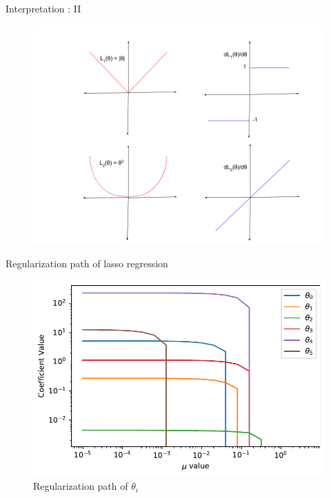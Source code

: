 \documentclass{beamer}
\begin{document}
\begin{frame}{Interpretation : II}
\begin{figure}
    \centering
    \includegraphics[scale = 0.3]{Lasso/lasso_3.png}
    \label{fig:my_label}
\end{figure}

\end{frame}




\begin{frame}{Regularization path of lasso regression}
\begin{figure}
    \centering
    \includegraphics[scale = 0.5]{Lasso/lasso_reg.pdf}
    \caption{Regularization path of $\theta_{i}$}
    \label{fig:my_label}
\end{figure}

\end{frame}
\end{document}
